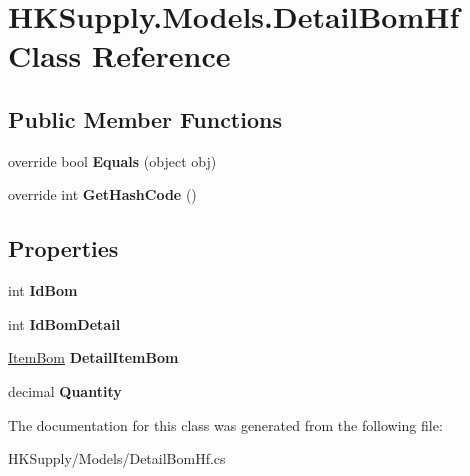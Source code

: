 \hypertarget{class_h_k_supply_1_1_models_1_1_detail_bom_hf}{}\section{H\+K\+Supply.\+Models.\+Detail\+Bom\+Hf Class Reference}
\label{class_h_k_supply_1_1_models_1_1_detail_bom_hf}
\subsection*{Public Member Functions}
\begin{DoxyCompactItemize}
\item 
\mbox{\label{class_h_k_supply_1_1_models_1_1_detail_bom_hf_add24b38f345926d40701ee69dfb0b0df}} 
override bool {\bfseries Equals} (object obj)
\item 
\mbox{\label{class_h_k_supply_1_1_models_1_1_detail_bom_hf_a2074b3ae9ef1285dc1dd556e4270691f}} 
override int {\bfseries Get\+Hash\+Code} ()
\end{DoxyCompactItemize}
\subsection*{Properties}
\begin{DoxyCompactItemize}
\item 
\mbox{\label{class_h_k_supply_1_1_models_1_1_detail_bom_hf_accf4f0edc1e98925c88904eb2126569d}} 
int {\bfseries Id\+Bom}
\item 
\mbox{\label{class_h_k_supply_1_1_models_1_1_detail_bom_hf_a46013767a6bd5634ea707cedaa6db5fe}} 
int {\bfseries Id\+Bom\+Detail}
\item 
\mbox{\label{class_h_k_supply_1_1_models_1_1_detail_bom_hf_a430ff40d9c96dde91115f8d5c0111d42}} 
\mbox{\hyperlink{class_h_k_supply_1_1_models_1_1_item_bom}{Item\+Bom}} {\bfseries Detail\+Item\+Bom}
\item 
\mbox{\label{class_h_k_supply_1_1_models_1_1_detail_bom_hf_a942e5d4dd66d7e78d70af432a1862f15}} 
decimal {\bfseries Quantity}
\end{DoxyCompactItemize}


The documentation for this class was generated from the following file\+:\begin{DoxyCompactItemize}
\item 
H\+K\+Supply/\+Models/Detail\+Bom\+Hf.\+cs\end{DoxyCompactItemize}
